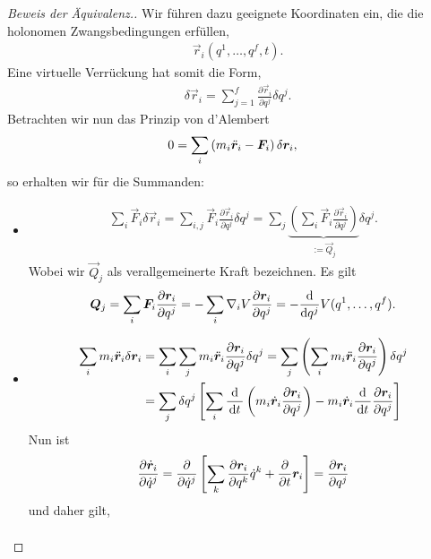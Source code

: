 \begin{proof}[Beweis der Äquivalenz.]
Wir führen dazu geeignete Koordinaten ein, die die holonomen Zwangsbedingungen
erfüllen,
\begin{align*}
&\vec{r}_i(q^1,\ldots,q^f,t).
\end{align*}
Eine virtuelle Verrückung hat somit die Form,
\begin{align*}
&\delta\vec{r}_i = \sum\limits_{j=1}^f \frac{\partial \vec{r}_i}{\partial
q^j}\delta q^j.
\end{align*}
Betrachten wir nun das Prinzip von d'Alembert
\begin{align*}
0 = \sum_i \left(m_i \ddot{\bm{r}}_i - \bm{F}_i\right)\delta\bm{r}_i,
\end{align*}
so erhalten wir für die Summanden:
\begin{itemize}
  \item 
\begin{align*}
\sum_i \vec{F}_i \delta \vec{r}_i = \sum_{i,j} \vec{F}_i \frac{\partial
\vec{r}_i}{\partial q^j}\delta q^j
= \sum_j \underbrace{\left(\sum_i \vec{F}_i \frac{\partial\vec{r}_i}{\partial
q^j}\right)}_{:=\vec{Q}_j}\delta q^j.
\end{align*}
Wobei wir $\vec{Q}_j$ als verallgemeinerte Kraft bezeichnen. Es gilt
\begin{align*}
\bm{Q}_j = \sum_i \bm{F}_i \frac{\partial\bm{r}_i}{\partial q^j}
= - \sum_i \nabla_i V \frac{\partial\bm{r}_i}{\partial q^j}
= -\frac{\mathrm{d}}{\mathrm{d} q^j}V(q^1,\ldots,q^f).
\end{align*}
\item
\begin{align*}
\sum_i m_i\ddot{\bm{r}}_i \delta\bm{r}_i  &= \sum_i\sum_j m_i\ddot{\bm{r}}_i 
\frac{\partial \bm{r}_i}{\partial q^j}\delta q^j = 
\sum_j \left(\sum_i m_i\ddot{\bm{r}}_i 
\frac{\partial \bm{r}_i}{\partial q^j}\right)\delta q^j\\
&= \sum_j \delta q^j \left[\sum_i \frac{\mathrm{d}}{\,\mathrm{d} t\,}\left( m_i\dot{\bm{r}}_i 
\frac{\partial \bm{r}_i}{\partial q^j}\right) -
m_i\dot{\bm{r}}_i\frac{\mathrm{d}}{\,\mathrm{d} t\,}\frac{\partial \bm{r}_i}{\partial q^j}\right]
\end{align*}
Nun ist
\begin{align*}
\frac{\partial
\dot{\bm{r}}_i}{\partial\dot{q}^j} = \frac{\partial}{\partial \dot{q}^j} \left[
\sum\limits_k \frac{\partial \bm{r}_i}{\partial q^k}\dot{q}^k +
\frac{\partial}{\partial t}\bm{r}_i \right] = \frac{\partial
\bm{r}_i}{\partial q^j}
\end{align*}
und daher gilt,
\begin{align*}

\end{align*}
\end{itemize}
\end{proof}
